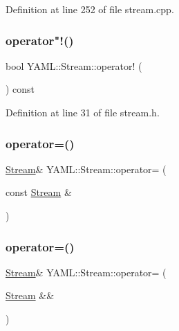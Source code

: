 Definition at line 252 of file stream.\+cpp.

\mbox{\label{class_y_a_m_l_1_1_stream_a62b4d0c8b6d764d75e8d5359b4dce670}} 
\subsubsection{\texorpdfstring{operator"!()}{operator!()}}
{\footnotesize\ttfamily bool Y\+A\+M\+L\+::\+Stream\+::operator! (\begin{DoxyParamCaption}{ }\end{DoxyParamCaption}) const\hspace{0.3cm}{\ttfamily [inline]}}



Definition at line 31 of file stream.\+h.

\mbox{\label{class_y_a_m_l_1_1_stream_aa92d3c7a073a05f48da64369a676fa7b}} 
\subsubsection{\texorpdfstring{operator=()}{operator=()}\hspace{0.1cm}{\footnotesize\ttfamily [1/2]}}
{\footnotesize\ttfamily \mbox{\hyperlink{class_y_a_m_l_1_1_stream}{Stream}}\& Y\+A\+M\+L\+::\+Stream\+::operator= (\begin{DoxyParamCaption}\item[{const \mbox{\hyperlink{class_y_a_m_l_1_1_stream}{Stream}} \&}]{ }\end{DoxyParamCaption})\hspace{0.3cm}{\ttfamily [delete]}}

\mbox{\label{class_y_a_m_l_1_1_stream_a133f14ef5c79b29024c91de47d8013cd}} 
\subsubsection{\texorpdfstring{operator=()}{operator=()}\hspace{0.1cm}{\footnotesize\ttfamily [2/2]}}
{\footnotesize\ttfamily \mbox{\hyperlink{class_y_a_m_l_1_1_stream}{Stream}}\& Y\+A\+M\+L\+::\+Stream\+::operator= (\begin{DoxyParamCaption}\item[{\mbox{\hyperlink{class_y_a_m_l_1_1_stream}{Stream}} \&\&}]{ }\end{DoxyParamCaption})\hspace{0.3cm}{\ttfamily [delete]}}

